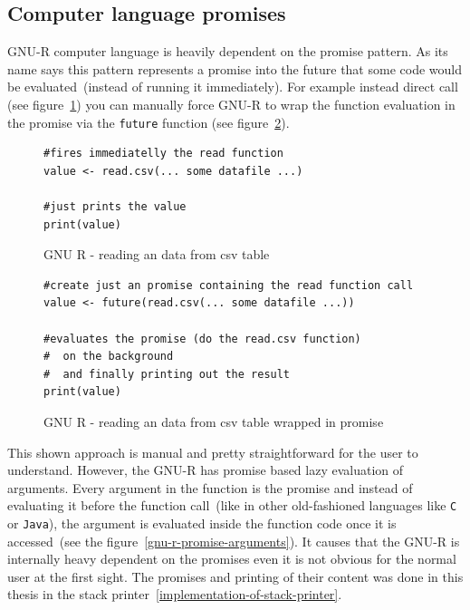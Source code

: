 \documentclass[thesis=M,english]{FITthesis}[2018/10/20]
\newcommand{\code}[1]{\texttt{#1}}
\begin{document}
\subsection{Computer language promises}\label{computer-promises}

GNU-R computer language is heavily dependent on the promise pattern. As its name says this pattern represents a promise into the future that some code would be evaluated~(instead of running it immediately). For example instead direct call (see figure~\ref{fig:reading-csv-without-promise}) you can manually force GNU-R to wrap the function evaluation in the promise via the \code{future} function (see figure~\ref{fig:reading-csv-with-promise}).

\begin{figure}[!h]
\begin{lstlisting}
#fires immediatelly the read function
value <- read.csv(... some datafile ...)

#just prints the value
print(value)
\end{lstlisting}
\caption{\label{fig:reading-csv-without-promise} GNU R - reading an data from csv table}
\end{figure}

\begin{figure}[!h]
\begin{lstlisting}
#create just an promise containing the read function call
value <- future(read.csv(... some datafile ...))

#evaluates the promise (do the read.csv function)
#  on the background
#  and finally printing out the result
print(value)
\end{lstlisting}
\caption{\label{fig:reading-csv-with-promise} GNU R - reading an data from csv table wrapped in promise}
\end{figure}

This shown approach is manual and pretty straightforward for the user to understand. However, the GNU-R has promise based lazy evaluation of arguments. Every argument in the function is the promise and instead of evaluating it before the function call~(like in other old-fashioned languages like \code{C} or \code{Java}), the argument is evaluated inside the function code once it is accessed~(see the figure~\ref{gnu-r-promise-arguments}). It causes that the GNU-R is internally heavy dependent on the promises even it is not obvious for the normal user at the first sight. The promises and printing of their content was done in this thesis in the stack printer~\ref{implementation-of-stack-printer}.
\end{document}
